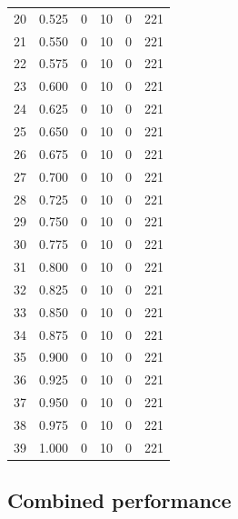 \documentclass[a4paper,twoside,12pt]{book}
\begin{document}
\begin{table}
\begin{tabular}{lrrrrr}
		20 &  0.525 &         0 &        10 &               0 &             221 \\
		21 &  0.550 &         0 &        10 &               0 &             221 \\
		22 &  0.575 &         0 &        10 &               0 &             221 \\
		23 &  0.600 &         0 &        10 &               0 &             221 \\
		24 &  0.625 &         0 &        10 &               0 &             221 \\
		25 &  0.650 &         0 &        10 &               0 &             221 \\
		26 &  0.675 &         0 &        10 &               0 &             221 \\
		27 &  0.700 &         0 &        10 &               0 &             221 \\
		28 &  0.725 &         0 &        10 &               0 &             221 \\
		29 &  0.750 &         0 &        10 &               0 &             221 \\
		30 &  0.775 &         0 &        10 &               0 &             221 \\
		31 &  0.800 &         0 &        10 &               0 &             221 \\
		32 &  0.825 &         0 &        10 &               0 &             221 \\
		33 &  0.850 &         0 &        10 &               0 &             221 \\
		34 &  0.875 &         0 &        10 &               0 &             221 \\
		35 &  0.900 &         0 &        10 &               0 &             221 \\
		36 &  0.925 &         0 &        10 &               0 &             221 \\
		37 &  0.950 &         0 &        10 &               0 &             221 \\
		38 &  0.975 &         0 &        10 &               0 &             221 \\
		39 &  1.000 &         0 &        10 &               0 &             221 \\
		\bottomrule
	\end{tabular}
\end{table}



\subsection{Combined performance}
\end{document}
